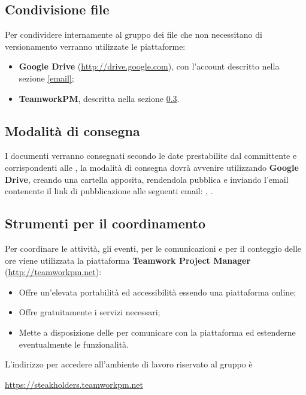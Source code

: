 \subsection{Condivisione file}

Per condividere internamente al gruppo dei file che non necessitano di versionamento verranno utilizzate le piattaforme:
\begin{itemize}
 \item \textbf{Google Drive} (\url{http://drive.google.com}), con l'account descritto nella sezione \ref{email};
 \item \textbf{TeamworkPM}, descritta nella sezione \ref{teamworkpm}.
\end{itemize}



\subsection{Modalità di consegna}
I documenti verranno consegnati secondo le date prestabilite dal committente e corrispondenti alle , la modalità di consegna dovrà avvenire utilizzando \textbf{Google Drive}, creando una cartella apposita, rendendola pubblica e inviando l'email contenente il link di pubblicazione alle seguenti email: , .



\subsection{Strumenti per il coordinamento}
\label{teamworkpm}

	Per coordinare le attività, gli eventi, per le comunicazioni e per il conteggio delle ore viene utilizzata la piattaforma \textbf{Teamwork Project Manager} (\url{http://teamworkpm.net}):
	\begin{itemize}
		\item Offre un'elevata portabilità ed accessibilità essendo una piattaforma online;
		\item Offre gratuitamente i servizi necessari;
		\item Mette a disposizione delle  per comunicare con la piattaforma ed estenderne eventualmente le funzionalità.
	\end{itemize}
	
	L'indirizzo per accedere all'ambiente di lavoro riservato al gruppo è
	\begin{center}
		\url{https://steakholders.teamworkpm.net}
	\end{center}
	
